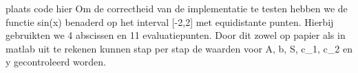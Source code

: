 plaats code hier
Om de correctheid van de implementatie te testen hebben we de functie sin(x) benaderd op het interval [-2,2] met equidistante punten. Hierbij gebruikten we 4 abscissen en 11 evaluatiepunten. Door dit zowel op papier als in matlab uit te rekenen kunnen stap per stap de waarden voor A, b, S, c_1, c_2 en y gecontroleerd worden.